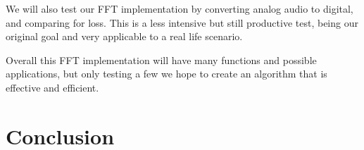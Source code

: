 \documentclass[12pt]{extarticle}
\begin{document}
	We will also test our FFT implementation by converting analog audio to digital, and comparing for loss. 
	This is a less intensive but still productive test, being our original goal and very applicable to a real life scenario. 
	
	Overall this FFT implementation will have many functions and possible applications, but only testing a few we hope to create an algorithm that is effective and efficient.

\section*{Conclusion}


\end{document}
